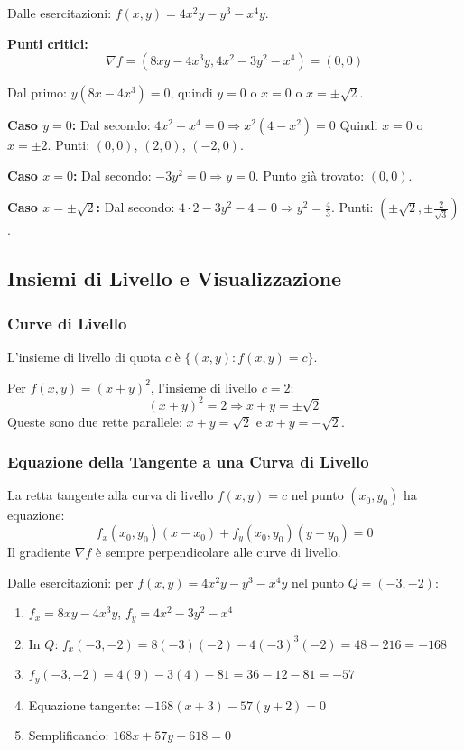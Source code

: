 \begin{esempio}
Dalle esercitazioni: $f(x,y) = 4x^2 y - y^3 - x^4 y$.

\textbf{Punti critici:}
\[ \nabla f = (8xy - 4x^3 y, 4x^2 - 3y^2 - x^4) = (0,0) \]

Dal primo: $y(8x - 4x^3) = 0$, quindi $y = 0$ o $x = 0$ o $x = \pm\sqrt{2}$.

\textbf{Caso $y = 0$:} Dal secondo: $4x^2 - x^4 = 0 \Rightarrow x^2(4-x^2) = 0$
Quindi $x = 0$ o $x = \pm 2$.
Punti: $(0,0)$, $(2,0)$, $(-2,0)$.

\textbf{Caso $x = 0$:} Dal secondo: $-3y^2 = 0 \Rightarrow y = 0$.
Punto già trovato: $(0,0)$.

\textbf{Caso $x = \pm\sqrt{2}$:} Dal secondo: $4 \cdot 2 - 3y^2 - 4 = 0 \Rightarrow y^2 = \frac{4}{3}$.
Punti: $(\pm\sqrt{2}, \pm\frac{2}{\sqrt{3}})$.
\end{esempio}

\subsection{Insiemi di Livello e Visualizzazione}

\subsubsection{Curve di Livello}
L'insieme di livello di quota $c$ è $\{(x,y) : f(x,y) = c\}$.

\begin{esempio}
Per $f(x,y) = (x+y)^2$, l'insieme di livello $c = 2$:
\[ (x+y)^2 = 2 \Rightarrow x+y = \pm\sqrt{2} \]
Queste sono due rette parallele: $x+y = \sqrt{2}$ e $x+y = -\sqrt{2}$.
\end{esempio}

\subsubsection{Equazione della Tangente a una Curva di Livello}

\begin{info}
La retta tangente alla curva di livello $f(x,y) = c$ nel punto $(x_0,y_0)$ ha equazione:
\[ f_x(x_0,y_0)(x-x_0) + f_y(x_0,y_0)(y-y_0) = 0 \]
Il gradiente $\nabla f$ è sempre perpendicolare alle curve di livello.
\end{info}

\begin{esempio}
Dalle esercitazioni: per $f(x,y) = 4x^2 y - y^3 - x^4 y$ nel punto $Q=(-3,-2)$:

\begin{enumerate}
    \item $f_x = 8xy - 4x^3 y$, $f_y = 4x^2 - 3y^2 - x^4$
    \item In $Q$: $f_x(-3,-2) = 8(-3)(-2) - 4(-3)^3(-2) = 48 - 216 = -168$
    \item $f_y(-3,-2) = 4(9) - 3(4) - 81 = 36 - 12 - 81 = -57$
    \item Equazione tangente: $-168(x+3) - 57(y+2) = 0$
    \item Semplificando: $168x + 57y + 618 = 0$
\end{enumerate}
\end{esempio}

